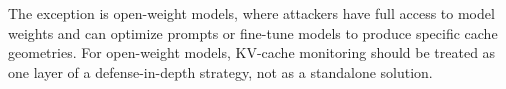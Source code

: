 The exception is open-weight models, where attackers have full access to model weights and can optimize prompts or fine-tune models to produce specific cache geometries. For open-weight models, KV-cache monitoring should be treated as one layer of a defense-in-depth strategy, not as a standalone solution.
